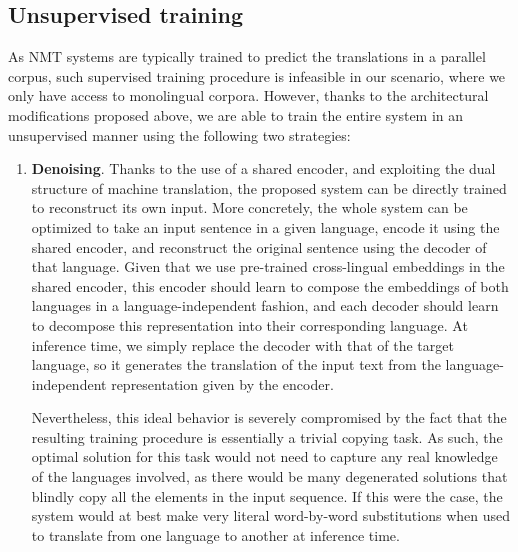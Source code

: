 \documentclass{article} \usepackage{iclr2018_conference,times}
\begin{document}
\subsection{Unsupervised training} 
\label{subsec:training}

As NMT systems are typically trained to predict the translations in a parallel corpus, such supervised training procedure is infeasible in our scenario, where we only have access to monolingual corpora. However, thanks to the architectural modifications proposed above, we are able to train the entire system in an unsupervised manner using the following two strategies:

\begin{enumerate}
\item \textbf{Denoising}. Thanks to the use of a shared encoder, and exploiting the dual structure of machine translation, the proposed system can be directly trained to reconstruct its own input. More concretely, the whole system can be optimized to take an input sentence in a given language, encode it using the shared encoder, and reconstruct the original sentence using the decoder of that language. Given that we use pre-trained cross-lingual embeddings in the shared encoder, this encoder should learn to compose the embeddings of both languages in a language-independent fashion, and each decoder should learn to decompose this representation into their corresponding language. At inference time, we simply replace the decoder with that of the target language, so it generates the translation of the input text from the language-independent representation given by the encoder.

Nevertheless, this ideal behavior is severely compromised by the fact that the resulting training procedure is essentially a trivial copying task. As such, the optimal solution for this task would not need to capture any real knowledge of the languages involved, as there would be many degenerated solutions that blindly copy all the elements in the input sequence. If this were the case, the system would at best make very literal word-by-word substitutions when used to translate from one language to another at inference time.


\end{enumerate}
\end{document}

